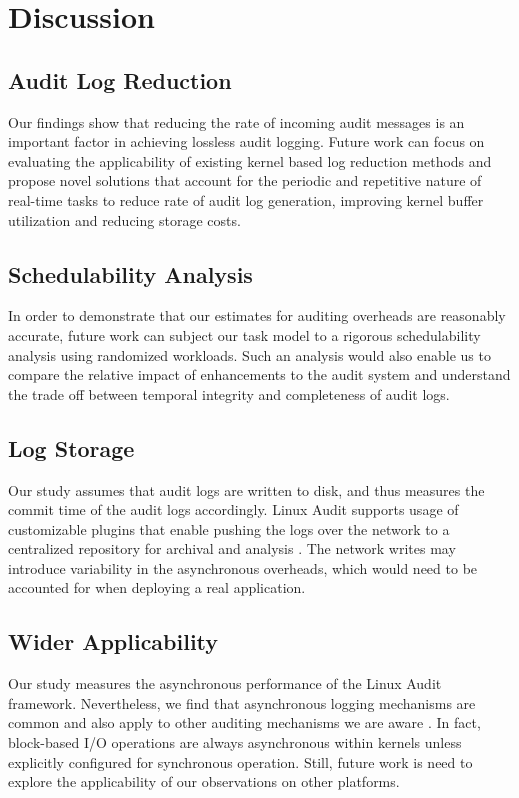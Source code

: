\section{Discussion}
\subsection{Audit Log Reduction} Our findings show that reducing the rate of incoming audit messages is an important factor in achieving lossless audit logging. Future work can focus on evaluating the applicability of existing kernel based log reduction methods \cite{Ma2018,Ma2016} and propose novel solutions that account for the periodic and repetitive nature of real-time tasks to reduce rate of audit log generation, improving kernel buffer utilization and reducing storage costs.

\subsection{Schedulability Analysis} In order to demonstrate that our estimates for auditing overheads are reasonably accurate, future work can subject our task model to a rigorous schedulability analysis using randomized workloads. Such an analysis would also enable us to compare the relative impact of enhancements to the audit system and understand the trade off between temporal integrity and completeness of audit logs.

\subsection{Log Storage} Our study assumes that audit logs are written to disk, and thus measures the commit time of the audit logs accordingly. Linux Audit supports usage of customizable plugins that enable pushing the logs over the network to a centralized repository for archival and analysis \cite{audisp-remote}. The network writes may introduce variability in the asynchronous overheads, which would need to be accounted for when deploying a real application.  

\subsection{Wider Applicability} Our study measures the asynchronous performance of the Linux Audit framework. Nevertheless, we find that asynchronous logging mechanisms are common and also apply to other auditing mechanisms we are aware \cite{Bates2015,Ma2015,Ma2016,ETW,Procmon}. In fact, block-based I/O operations are always asynchronous within kernels unless explicitly configured for synchronous operation. Still, future work is need to explore the applicability of our observations on other platforms.